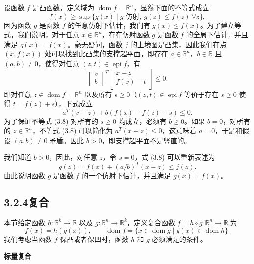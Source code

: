 \documentclass[UTF8, 12pt, fontset=fandol, oneside]{ctexart}
\DeclareMathOperator{\dom}{dom}
\DeclareMathOperator{\epi}{epi}
\begin{document}
设函数 $f$ 是凸函数，定义域为 $\dom f=\mathbb{R}^n$，显然下面的不等式成立
\[
f(x)\geq \sup\{g(x)\mid g\text{ 仿射},\ g(z)\leq f(z)\ \forall z\},
\]
因为函数 $g$ 是函数 $f$ 的任意仿射下估计，我们有 $g(x)\leq f(x)$。为了建立等式，我们说明，对于任意 $x\in\mathbb{R}^n$，存在仿射函数 $g$ 是函数 $f$ 的全局下估计，并且满足 $g(x)=f(x)$。毫无疑问，函数 $f$ 的上境图是凸集，因此我们在点 $(x,f(x))$ 处可以找到此凸集的支撑超平面，即存在 $a\in\mathbb{R}^n$，$b\in\mathbb{R}$ 且 $(a,b)\neq0$，使得对任意 $(z,t)\in\epi f$，有
\[
\begin{bmatrix}
a\\
b
\end{bmatrix}^T
\begin{bmatrix}
x-z\\
f(x)-t
\end{bmatrix}
\leq0.
\]
即对任意 $z\in\dom f=\mathbb{R}^n$ 以及所有 $s\geq0$（$(z,t)\in\epi f$ 等价于存在 $s\geq0$ 使得 $t=f(z)+s$），下式成立
\begin{equation}
a^T(x-z)+b(f(x)-f(z)-s)\leq0.
\tag{3.8}
\end{equation}
为了保证不等式 (3.8) 对所有的 $s\geq0$ 均成立，必须有 $b\geq0$。如果 $b=0$，对所有的 $z\in\mathbb{R}^n$，不等式 (3.8) 可以简化为 $a^T(x-z)\leq0$，这意味着 $a=0$，于是和假设 $(a,b)\neq0$ 矛盾。因此 $b>0$，即支撑超平面不是竖直的。

我们知道 $b>0$，因此，对任意 $z$，令 $s=0$，式 (3.8) 可以重新表述为
\[
g(z)=f(x)+(a/b)^T(x-z)\leq f(z).
\]
由此说明函数 $g$ 是函数 $f$ 的一个仿射下估计，并且满足 $g(x)=f(x)$。

\subsection*{3.2.4\quad 复合}

本节给定函数 $h:\mathbb{R}^k\to\mathbb{R}$ 以及 $g:\mathbb{R}^n\to\mathbb{R}^k$，定义复合函数 $f=h\circ g:\mathbb{R}^n\to\mathbb{R}$ 为
\[
f(x)=h(g(x)),\qquad \dom f=\{x\in\dom g\mid g(x)\in\dom h\}.
\]
我们考虑当函数 $f$ 保凸或者保凹时，函数 $h$ 和 $g$ 必须满足的条件。

\noindent\textbf{标量复合}
\end{document}
